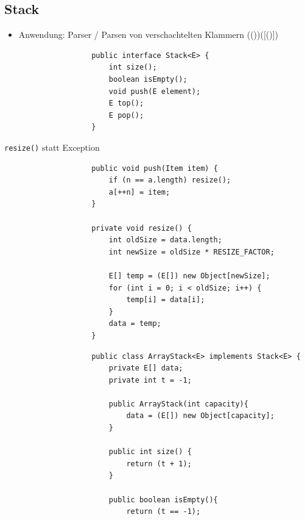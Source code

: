 \documentclass[a4paper, landscape, 8pt]{scrartcl}
\begin{document}
\begin{multicols*}{4}
        \subsection{Stack}
            \begin{itemize}
                \item Anwendung: Parser / Parsen von verschachtelten Klammern (())([()])
            \end{itemize}
            \newline
            \begin{lstlisting}
                    public interface Stack<E> {
                        int size();
                        boolean isEmpty();
                        void push(E element);
                        E top();
                        E pop();
                    }
            \end{lstlisting}
            \newline
            \newline
            \texttt{resize()} statt Exception
            \begin{lstlisting}
                    public void push(Item item) {
                        if (n == a.length) resize();
                        a[++n] = item;
                    }

                    private void resize() {
                        int oldSize = data.length;
                        int newSize = oldSize * RESIZE_FACTOR;

                        E[] temp = (E[]) new Object[newSize];
                        for (int i = 0; i < oldSize; i++) {
                            temp[i] = data[i];
                        }
                        data = temp;
                    }
            \end{lstlisting}
            \begin{lstlisting}
                    public class ArrayStack<E> implements Stack<E> {
                        private E[] data;
                        private int t = -1;

                        public ArrayStack(int capacity){
                            data = (E[]) new Object[capacity];
                        }

                        public int size() {
                            return (t + 1);
                        }

                        public boolean isEmpty(){
                            return (t == -1);


\end{lstlisting}
\end{multicols*}
\end{document}
